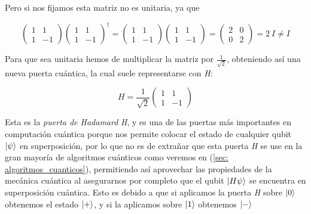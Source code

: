 \documentclass[12pt]{article}
\numberwithin{equation}{section} %
\begin{document}
    Pero si nos fijamos esta matriz no es unitaria, ya que

    \begin{equation*}
        \begin{pmatrix}
            1 & 1 \\
            1 & -1
        \end{pmatrix} \begin{pmatrix}
            1 & 1 \\
            1 & -1
        \end{pmatrix} ^ {\dagger} = \begin{pmatrix}
            1 & 1 \\
            1 & -1
        \end{pmatrix} \begin{pmatrix}
            1 & 1 \\
            1 & -1
        \end{pmatrix} = \begin{pmatrix}
            2 & 0 \\
            0 & 2
        \end{pmatrix} = 2 \ I \neq I
    \end{equation*}

    \vspace{2.5mm} 

    Para que sea unitaria hemos de multiplicar la matriz por \( \frac{1}{\sqrt{2}} \), obteniendo así una nueva puerta cuántica, la cual suele representarse con \textit{H}:

    \begin{equation}
        H = \frac{1}{\sqrt{2}} \begin{pmatrix}
            1 & 1 \\
            1 & -1
        \end{pmatrix}
        \label{eq: puerta_hadamard}
    \end{equation}

    \vspace{2.5mm}

    Esta es la \textit{puerta de Hadamard} \textit{H}, y es una de las puertas más importantes en computación cuántica porque nos permite colocar el estado de cualquier qubit \( \ket{\psi} \) en superposición, por lo que no es de extrañar que esta puerta \textit{H} se use en la gran mayoría de algoritmos cuánticos como veremos en (\ref{sec: algoritmos_cuanticos}), permitiendo así aprovechar las propiedades de la mecánica cuántica al asegurarnos por completo que el qubit \( \ket{H \psi} \) se encuentra en superposición cuántica. Esto es debido a que si aplicamos la puerta \textit{H} sobre \( \ket{0} \) obtenemos el estado \( \ket{+} \), y si la aplicamos sobre \( \ket{1} \) obtenemos \( \ket{-} \)
\end{document}
